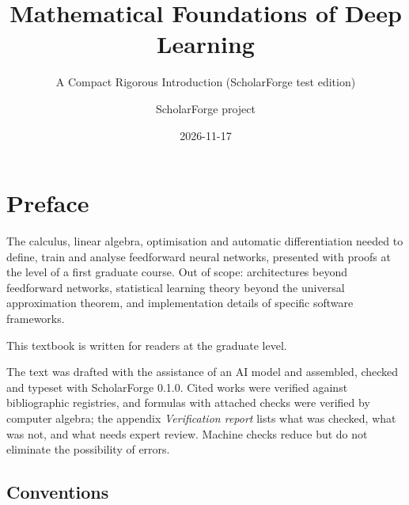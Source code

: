 \documentclass[
  english,
  11pt,
  a4paper,
  twoside,
  open=any,
  numbers=noenddot]{scrbook}
\title{Mathematical Foundations of Deep Learning}
\subtitle{A Compact Rigorous Introduction (ScholarForge test edition)}
\author{ScholarForge project}
\date{2026-11-17}
\renewcommand*\contentsname{Table of contents}
\newcommand\contentsname{Table of contents}
\theoremstyle{plain}
\theoremstyle{plain}
\theoremstyle{plain}
\theoremstyle{definition}
\theoremstyle{definition}
\theoremstyle{definition}
\theoremstyle{remark}
\begin{document}
\frontmatter
\maketitle

\renewcommand*\contentsname{Table of contents}
{
\setcounter{tocdepth}{1}
\tableofcontents
}

\mainmatter
{}

\chapter*{Preface}\label{preface}


The calculus, linear algebra, optimisation and automatic differentiation
needed to define, train and analyse feedforward neural networks,
presented with proofs at the level of a first graduate course. Out of
scope: architectures beyond feedforward networks, statistical learning
theory beyond the universal approximation theorem, and implementation
details of specific software frameworks.

This textbook is written for readers at the graduate level.

\begin{tcolorbox}[enhanced jigsaw, arc=.35mm, bottomrule=.15mm, bottomtitle=1mm, breakable, colback=white, colbacktitle=quarto-callout-note-color!10!white, colframe=quarto-callout-note-color-frame, coltitle=black, left=2mm, leftrule=.75mm, opacityback=0, opacitybacktitle=0.6, rightrule=.15mm, title=\textcolor{quarto-callout-note-color}{\faInfo}\hspace{0.5em}{How this book was produced}, titlerule=0mm, toprule=.15mm, toptitle=1mm]

The text was drafted with the assistance of an AI model and assembled,
checked and typeset with ScholarForge 0.1.0. Cited works were verified
against bibliographic registries, and formulas with attached checks were
verified by computer algebra; the appendix \emph{Verification report}
lists what was checked, what was not, and what needs expert review.
Machine checks reduce but do not eliminate the possibility of errors.

\end{tcolorbox}

\section*{Conventions}\label{conventions}
\end{document}
